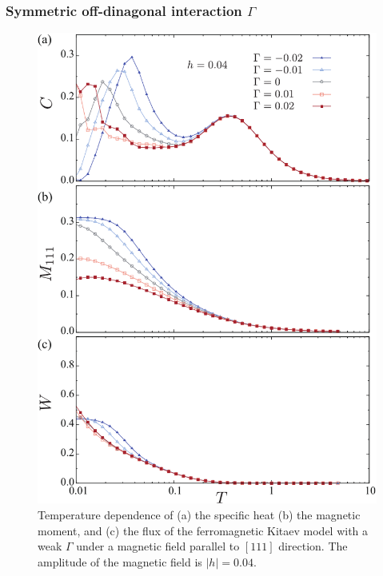 \documentclass[reprint,amsmath,amssymb,aps,prx]{revtex4-2}
\begin{document}
   \subsubsection{Symmetric off-dinagonal interaction $\Gamma$} 
\begin{figure}
  \begin{center}
    \includegraphics[width=0.9\linewidth]{plot_CMF_h0.04_G.pdf}
  \end{center}
  \caption{Temperature dependence of (a) the specific heat (b) the magnetic moment, and (c) the flux of the ferromagnetic Kitaev model with a weak $\Gamma$ under a magnetic field parallel to $[111]$ direction. The amplitude of the magnetic field is $|h|=0.04$.}
  \label{fig:CMF_h0.04_G}
\end{figure}
\end{document}

